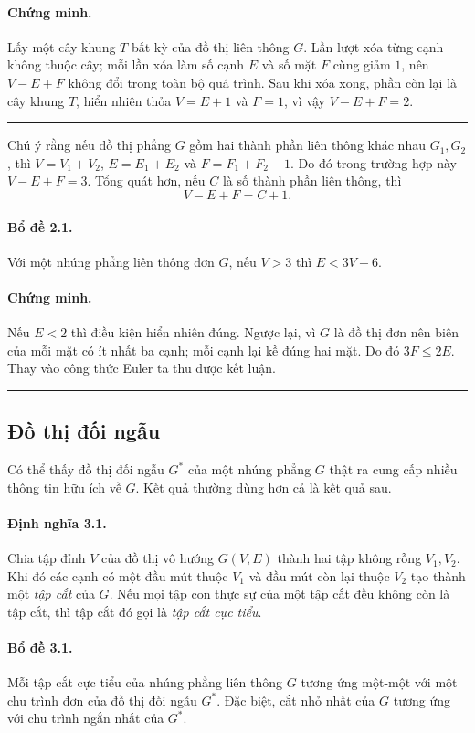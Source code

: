 \documentclass[11pt]{article}
\begin{document}
\paragraph{Chứng minh.}
Lấy một cây khung $T$ bất kỳ của đồ thị liên thông $G$. Lần lượt xóa từng cạnh
không thuộc cây; mỗi lần xóa làm số cạnh $E$ và số mặt $F$ cùng giảm $1$, nên
$V-E+F$ không đổi trong toàn bộ quá trình. Sau khi xóa xong, phần còn lại là
cây khung $T$, hiển nhiên thỏa $V=E+1$ và $F=1$, vì vậy $V-E+F=2$.
\hfill\rule{0.55em}{0.55em}

Chú ý rằng nếu đồ thị phẳng $G$ gồm hai thành phần liên thông khác nhau
$G_1,G_2$, thì $V=V_1+V_2$, $E=E_1+E_2$ và $F=F_1+F_2-1$. Do đó trong trường
hợp này $V-E+F=3$. Tổng quát hơn, nếu $C$ là số thành phần liên thông, thì
\[
  V-E+F=C+1.
\]

\paragraph{Bổ đề 2.1.}
Với một nhúng phẳng liên thông đơn $G$, nếu $V>3$ thì $E<3V-6$.

\paragraph{Chứng minh.}
Nếu $E<2$ thì điều kiện hiển nhiên đúng. Ngược lại, vì $G$ là đồ thị đơn nên
biên của mỗi mặt có ít nhất ba cạnh; mỗi cạnh lại kề đúng hai mặt. Do đó
$3F\le 2E$. Thay vào công thức Euler ta thu được kết luận.
\hfill\rule{0.55em}{0.55em}

\subsection{Đồ thị đối ngẫu}

Có thể thấy đồ thị đối ngẫu $G^*$ của một nhúng phẳng $G$ thật ra cung cấp
nhiều thông tin hữu ích về $G$. Kết quả thường dùng hơn cả là kết quả sau.

\paragraph{Định nghĩa 3.1.}
Chia tập đỉnh $V$ của đồ thị vô hướng $G(V,E)$ thành hai tập không rỗng
$V_1,V_2$. Khi đó các cạnh có một đầu mút thuộc $V_1$ và đầu mút còn lại thuộc
$V_2$ tạo thành một \emph{tập cắt} của $G$. Nếu mọi tập con thực sự của một tập
cắt đều không còn là tập cắt, thì tập cắt đó gọi là \emph{tập cắt cực tiểu}.

\paragraph{Bổ đề 3.1.}
Mỗi tập cắt cực tiểu của nhúng phẳng liên thông $G$ tương ứng một-một với một
chu trình đơn của đồ thị đối ngẫu $G^*$. Đặc biệt, cắt nhỏ nhất của $G$ tương
ứng với chu trình ngắn nhất của $G^*$.
\end{document}
